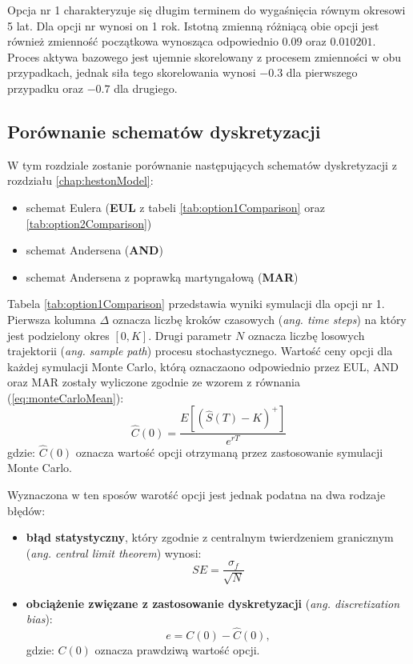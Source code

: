\documentclass{pracamgr}
\begin{document}
Opcja nr 1 charakteryzuje się długim terminem do wygaśnięcia równym okresowi 5 lat. Dla opcji
nr wynosi on 1 rok. Istotną zmienną różniącą obie opcji jest również zmienność początkowa 
wynosząca odpowiednio $0.09$ oraz $0.010201$. Proces aktywa bazowego jest ujemnie skorelowany
z procesem zmienności w obu przypadkach, jednak siła tego skorelowania wynosi $-0.3$ dla 
pierwszego przypadku oraz $-0.7$ dla drugiego.

\subsection{Porównanie schematów dyskretyzacji}
\label{sub:simulationNumericResult}
W tym rozdziale zostanie porównanie następujących schematów dyskretyzacji z rozdziału \ref{chap:hestonModel}:
\begin{itemize}
  \item schemat Eulera (\textbf{EUL} z tabeli \ref{tab:option1Comparison} oraz \ref{tab:option2Comparison})
  \item schemat Andersena (\textbf{AND})
  \item schemat Andersena z poprawką martyngałową (\textbf{MAR})
\end{itemize}
Tabela \ref{tab:option1Comparison} przedstawia wyniki symulacji 
dla opcji nr 1. Pierwsza kolumna $\Delta$ oznacza
liczbę kroków czasowych (\textit{ang. time steps}) na który 
jest podzielony okres $[0, K]$. Drugi parametr $N$ oznacza liczbę
losowych trajektorii (\textit{ang. sample path}) procesu stochastycznego. 
Wartość ceny opcji dla każdej symulacji Monte Carlo, 
którą oznaczaono odpowiednio przez EUL, AND oraz MAR 
zostały wyliczone zgodnie ze wzorem z równania (\ref{eq:monteCarloMean}):
\begin{equation}
  \hat{C}(0) = \frac{E \left[ (\hat{S}(T) - K)^{+} \right]}{e^{rT}}
\end{equation}
gdzie: $\hat{C}(0)$ oznacza wartość opcji otrzymaną przez zastosowanie symulacji Monte Carlo.

Wyznaczona w ten sposów warotść opcji jest jednak podatna na dwa rodzaje błędów:
\begin{itemize}
  \item \textbf{błąd statystyczny}, który zgodnie z centralnym twierdzeniem granicznym 
    (\textit{ang. central limit theorem}) wynosi:
  \begin{equation}
    SE = \frac{\sigma_f}{\sqrt{N}}
  \end{equation}

  \item \textbf{obciążenie zwięzane z zastosowanie dyskretyzacji} (\textit{ang. discretization bias}):
  \begin{equation}
    e = C(0) - \hat{C}(0),
  \end{equation}
  gdzie: $C(0)$ oznacza prawdziwą wartość opcji.
\end{itemize}
\end{document}
